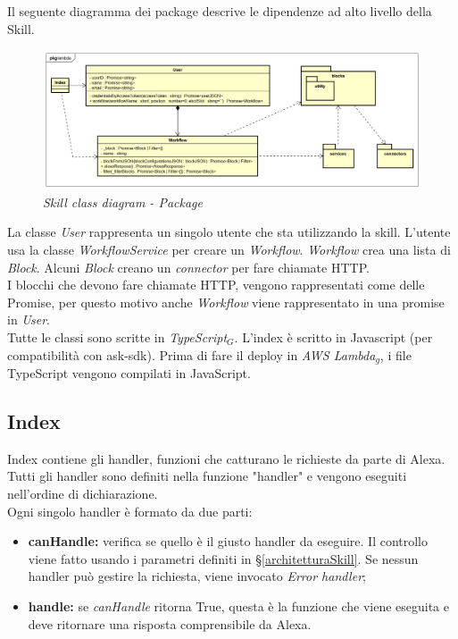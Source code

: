 Il seguente diagramma dei package descrive le dipendenze ad alto livello della Skill.\\
\begin{figure} [H]
    \centering
	\includegraphics[scale=0.35]{./images/ZeroSevenPackageLambda.png}
	\caption{\textit{Skill class diagram - Package}}\label{classlambda}
\end{figure}
\clearpage
La classe \textit{User} rappresenta un singolo utente che sta utilizzando la skill. L'utente usa la classe \textit{WorkflowService} per creare un \textit{Workflow}. \textit{Workflow} crea una lista di \textit{Block}. Alcuni \textit{Block} creano un \textit{connector} per fare chiamate HTTP.\\
I blocchi che devono fare chiamate HTTP, vengono rappresentati come delle Promise, per questo motivo anche \textit{Workflow} viene rappresentato in una promise in \textit{User}.\\
Tutte le classi sono scritte in \textit{TypeScript$_{G}$}. L'index è scritto in Javascript (per compatibilità con ask-sdk). Prima di fare il deploy in \textit{AWS Lambda$_{g}$}, i file TypeScript vengono compilati in JavaScript.
\subsection{Index}
Index contiene gli handler, funzioni che catturano le richieste da parte di Alexa. Tutti gli handler sono definiti nella funzione "handler" e vengono eseguiti nell'ordine di dichiarazione.\\Ogni singolo handler è formato da due parti:
\begin{itemize}
    \item \textbf{canHandle:} verifica se quello è il giusto handler da eseguire. Il controllo viene fatto usando i parametri definiti in \S\ref{architetturaSkill}. Se nessun handler può gestire la richiesta, viene invocato \textit{Error handler};
    \item \textbf{handle:} se \textit{canHandle} ritorna True, questa è la funzione che viene eseguita e deve ritornare una risposta comprensibile da Alexa.
\end{itemize}
